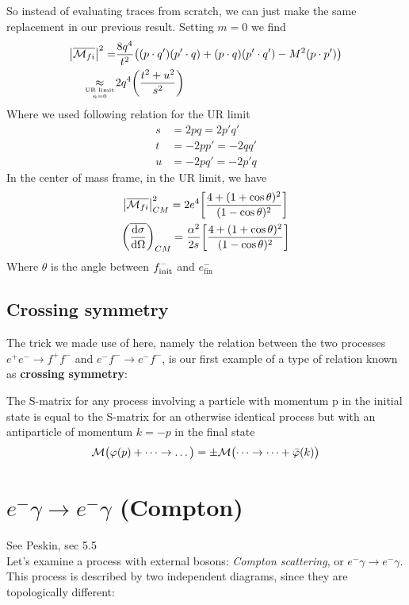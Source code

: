 \documentclass[TheoreticalPhy_ModB.tex]{subfiles}
\begin{document}
So instead of evaluating traces from scratch, we can just make the same replacement in our previous result. Setting $m = 0$ we find
\begin{align*}
\left\lvert \overline{\mathcal{M}_{fi}} \right\rvert^2 = 	& \frac{8q^4}{t^2} \bigl( (p \cdot q')(p' \cdot q) + (p \cdot q)(p' \cdot q') - M^2 (p \cdot p') \bigr) \\
	\underset{\text{UR limit} \atop n=0}{\approx}
							& 2q^4 \biggl( \frac{t^2 + u^2}{s^2} \biggr)
\end{align*}
Where we used following relation for the UR limit
\[
\begin{split}
s 	& = 2pq = 2p'q' \\
t 	& = -2pp' = -2qq' \\
u 	& = -2pq' = -2p'q
\end{split}
\]
In the center of mass frame, in the UR limit, we have
\begin{gather*}
\left\lvert \overline{\mathcal{M}_{fi}} \right\rvert^2_{CM} = 2e^4 \biggl[ \frac{4 + (1 + \cos \theta)^2}{(1 - \cos \theta)^2} \biggr] \\
\biggl( \overline{\frac{\textup{d} \sigma}{\textup{d} \Omega}} \biggr)_{CM} 
	= \frac{\alpha^2}{2s} \biggl[ \frac{4 + (1 + \cos \theta)^2}{(1 - \cos \theta)^2} \biggr]
\end{gather*}
Where $\theta$ is the angle between $f^-_{\textup{init}}$ and $e^-_{\text{fin}}$\\

\skipline
\subsection{Crossing symmetry}
The trick we made use of here, namely the relation between the two processes $e^+e^- \to f^+f^-$ and $e^-f^- \to e^-f^-$, is our first example of a type of relation known as \textbf{crossing symmetry}:
\begin{mdframed}[style=mybox]
The S-matrix for any process involving a particle with momentum p in the initial state is equal to the S-matrix for an otherwise identical process but with an antiparticle of momentum $k = -p$ in the final state
\[
\mathcal{M} \bigl( \varphi(p) + \dots \to \dots \bigr) = \pm \mathcal{M} \bigl( \dots \to \dots + \bar{\varphi}(k) \bigr)
\]
\end{mdframed}

\section{$e^-\gamma\rightarrow e^-\gamma$ (Compton)}
\textsf{See Peskin, sec 5.5}\\
Let's examine a process with external bosons: \emph{Compton scattering}, or $e^-\gamma\rightarrow e^-\gamma$. This process is described by two independent diagrams, since they are topologically different:
\end{document}

